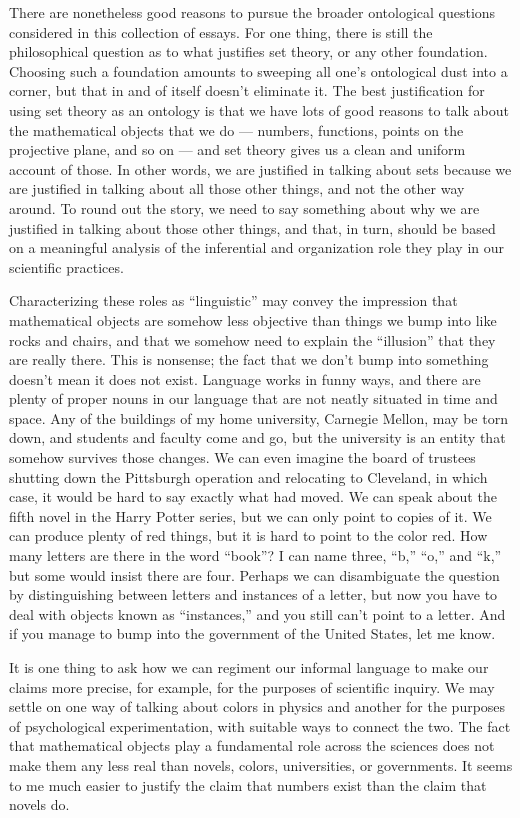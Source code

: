 \documentclass[12pt]{article}
\begin{document}
There are nonetheless good reasons to pursue the broader ontological questions considered in this collection of essays. For one thing, there is still the philosophical question as to what justifies set theory, or any other foundation. Choosing such a foundation amounts to sweeping all one's ontological dust into a corner, but that in and of itself doesn't eliminate it. The best justification for using set theory as an ontology is that we have lots of good reasons to talk about the mathematical objects that we do --- numbers, functions, points on the projective plane, and so on --- and set theory gives us a clean and uniform account of those. In other words, we are justified in talking about sets because we are justified in talking about all those other things, and not the other way around. To round out the story, we need to say something about why we are justified in talking about those other things, and that, in turn, should be based on a meaningful analysis of the inferential and organization role they play in our scientific practices.

Characterizing these roles as ``linguistic'' may convey the impression that mathematical objects are somehow less objective than things we bump into like rocks and chairs, and that we somehow need to explain the ``illusion'' that they are really there. This is nonsense; the fact that we don't bump into something doesn't mean it does not exist. Language works in funny ways, and there are plenty of proper nouns in our language that are not neatly situated in time and space. Any of the buildings of my home university, Carnegie Mellon, may be torn down, and students and faculty come and go, but the university is an entity that somehow survives those changes. We can even imagine the board of trustees shutting down the Pittsburgh operation and relocating to Cleveland, in which case, it would be hard to say exactly what had moved. We can speak about the fifth novel in the Harry Potter series, but we can only point to copies of it. We can produce plenty of red things, but it is hard to point to the color red. How many letters are there in the word ``book''? I can name three, ``b,'' ``o,'' and ``k,'' but some would insist there are four. Perhaps we can disambiguate the question by distinguishing between letters and instances of a letter, but now you have to deal with objects known as ``instances,'' and you still can't point to a letter. And if you manage to bump into the government of the United States, let me know.

It is one thing to ask how we can regiment our informal language to make our claims more precise, for example, for the purposes of scientific inquiry. We may settle on one way of talking about colors in physics and another for the purposes of psychological experimentation, with suitable ways to connect the two. The fact that mathematical objects play a fundamental role across the sciences does not make them any less real than novels, colors, universities, or governments. It seems to me much easier to justify the claim that numbers exist than the claim that novels do.
\end{document}
